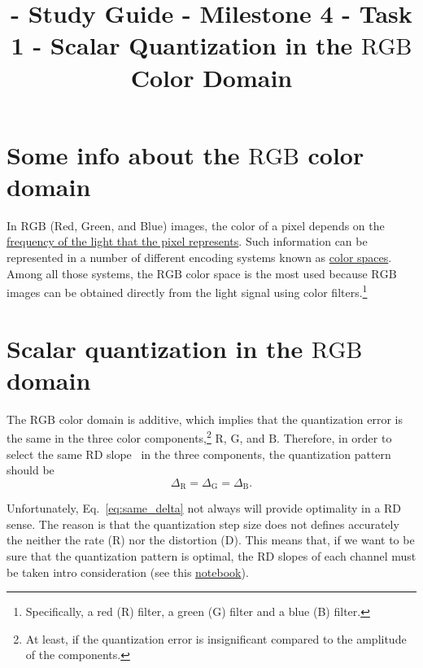 

\title{\SM{} - Study Guide - Milestone 4 - Task 1 - Scalar Quantization in the $\text{RGB}$ Color Domain}

\maketitle

\tableofcontents

\section{Some info about the $\text{RGB}$ color domain}

In $\text{RGB}$ (Red, Green, and Blue) images, the color of a pixel
depends on the
\href{https://en.wikipedia.org/wiki/Visible_spectrum}{frequency of the
  light that the pixel represents}. Such information can be
represented in a number of different encoding systems known as
\href{https://en.wikipedia.org/wiki/Color_space}{color spaces}. Among
all those systems, the $\text{RGB}$ color space is the most used
because $\text{RGB}$ images can be obtained directly from the light
signal using color filters.\footnote{Specifically, a red (R) filter, a
green (G) filter and a blue (B) filter.}


\section{Scalar quantization in the $\text{RGB}$ domain}

The $\text{RGB}$ color domain is additive, which implies that the
quantization error is the same in the three color
components,\footnote{At least, if the quantization error is
insignificant compared to the amplitude of the components.}
$\text{R}$, $\text{G}$, and $\text{B}$. Therefore, in order to select
the same RD slope~\cite{vruiz__information_theory} in the three
components, the quantization pattern should be
\begin{equation}
  \Delta_\text{R} = \Delta_\text{G} = \Delta_\text{B}.
  \label{eq:same_delta}
\end{equation}

Unfortunately, Eq.~\eqref{eq:same_delta} not always will provide
optimality in a RD sense. The reason is that the quantization step
size does not defines accurately the neither the rate (R) nor the
distortion (D). This means that, if we want to be sure that the
quantization pattern is optimal, the RD slopes of each channel must be
taken intro consideration (see this
\href{https://github.com/Sistemas-Multimedia/Sistemas-Multimedia.github.io/blob/master/contents/RGB_quantization/RD_performance.ipynb}{notebook}).

